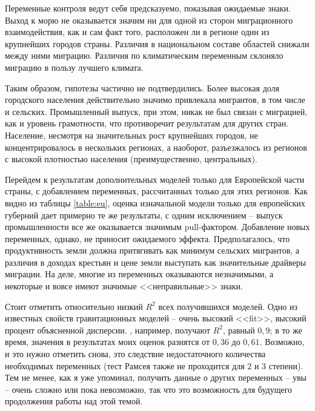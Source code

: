 \documentclass[a4paper,12pt]{article}
\begin{document}
Переменные контроля ведут себя предсказуемо, показывая ожидаемые знаки. Выход к морю не оказывается значим ни для одной из сторон миграционного взаимодействия, как и сам факт того, расположен ли в регионе один из крупнейших городов страны. Различия в национальном составе областей снижали между ними миграцию. Различия по климатическим переменным склоняло миграцию в пользу лучшего климата.

Таким образом, гипотезы частично не подтвердились. Более высокая доля городского населения действительно значимо привлекала мигрантов, в том числе и сельских. Промышленный выпуск, при этом, никак не был связан с миграцией, как и уровень грамотности, что противоречит результатам для других стран. %
Население, несмотря на значительных рост крупнейших городов, не концентрировалось в нескольких регионах, а наоборот, разъезжалось из регионов с высокой плотностью населения (преимущественно, центральных).


Перейдем к результатам дополнительных моделей только для Европейской части страны, с добавлением переменных, рассчитанных только для этих регионов. Как видно из таблицы \ref{table:eu}, оценка изначальной модели только для европейских губерний дает примерно те же результаты, с одним исключением -- выпуск промышленности все же оказывается значимым pull-фактором. Добавление новых переменных, однако, не приносит ожидаемого эффекта. Предполагалось, что продуктивность земли должна притягивать как минимум сельских мигрантов, а различия в доходах крестьян и цене земли выступать как значительные драйверы миграции. На деле, многие из переменных оказываются незначимыми, а некоторые и вовсе имеют значимые <<неправильные>> знаки. 

Стоит отметить относительно низкий $R^2$ всех получившихся моделей. Одно из известных свойств гравитационных моделей -- очень высокий <<fit>>, высокий процент объясненной дисперсии. \citeauthor{indonesia_2017}, например, получают $R^2$, равный $0,9$; в то же время, значения в результатах моих оценок разнятся от $0,36$ до $0,61$. Возможно, и это нужно отметить снова, это следствие недостаточного количества необходимых переменных (тест Рамсея также не проходится для 2 и 3 степени). Тем не менее, как я уже упоминал, получить данные о других переменных -- увы -- очень сложно или пока невозможно, так что это возможность для будущего продолжения работы над этой темой.

%
\end{document}
